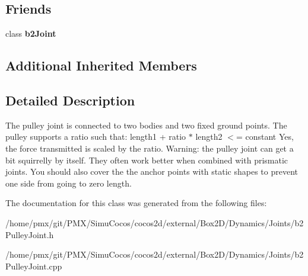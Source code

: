 \subsection*{Friends}
\begin{DoxyCompactItemize}
\item 
\mbox{\label{classb2PulleyJoint_a2f8aeb7f12b8fbe115431953a4926eed}} 
class {\bfseries b2\+Joint}
\end{DoxyCompactItemize}
\subsection*{Additional Inherited Members}


\subsection{Detailed Description}
The pulley joint is connected to two bodies and two fixed ground points. The pulley supports a ratio such that\+: length1 + ratio $\ast$ length2 $<$= constant Yes, the force transmitted is scaled by the ratio. Warning\+: the pulley joint can get a bit squirrelly by itself. They often work better when combined with prismatic joints. You should also cover the the anchor points with static shapes to prevent one side from going to zero length. 

The documentation for this class was generated from the following files\+:\begin{DoxyCompactItemize}
\item 
/home/pmx/git/\+P\+M\+X/\+Simu\+Cocos/cocos2d/external/\+Box2\+D/\+Dynamics/\+Joints/b2\+Pulley\+Joint.\+h\item 
/home/pmx/git/\+P\+M\+X/\+Simu\+Cocos/cocos2d/external/\+Box2\+D/\+Dynamics/\+Joints/b2\+Pulley\+Joint.\+cpp\end{DoxyCompactItemize}
